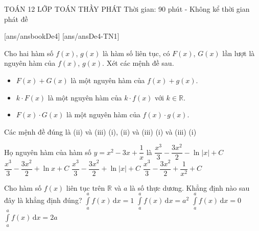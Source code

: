 \begin{name}
	{\tenchude}
	{TOÁN 12}
	{LỚP TOÁN THẦY PHÁT}
	{Thời gian: 90 phút - Không kể thời gian phát đề}
\end{name}
[ans/ansbookDe4]
\TN
{}[ans/ansDe4-TN1]
\begin{ex}%
Cho hai hàm số $f(x)$, $g(x)$ là hàm số liên tục, có $F(x)$, $G(x)$ lần lượt là nguyên hàm của $f(x)$, $g(x)$. Xét các mệnh đề sau.
\begin{itemize}
\item[(i)] $F(x)+G(x)$ là một nguyên hàm của $f(x)+g(x)$.
\item[(ii)] $k\cdot F(x)$ là một nguyên hàm của $k\cdot f(x)$ với $k\in\mathbb{R}$.
\item[(iii)] $F(x)\cdot G(x)$ là một nguyên hàm của $f(x)\cdot g(x)$.
\end{itemize}
Các mệnh đề đúng là
\choice
{(ii) và (iii)}
{(i), (ii) và (iii)}
{(i) và (iii)}
{\True (i)}
\end{ex}

\begin{ex}%
Họ nguyên hàm của hàm số $y=x^2-3x+\dfrac{1}{x}$ là
\choice
{$\dfrac{x^3}{3}-\dfrac{3x^2}{2}-\ln\left|x\right|+C$}
{$\dfrac{x^3}{3}-\dfrac{3x^2}{2}+\ln x+C$}
{\True $\dfrac{x^3}{3}-\dfrac{3x^2}{2}+\ln\left|x\right|+C$}
{$\dfrac{x^3}{3}-\dfrac{3x^2}{2}+\dfrac{1}{x^2}+C$}
\end{ex}

\begin{ex}%
Cho hàm số $f(x)$ liên tục trên $\mathbb{R}$ và $a$ là số thực dương. Khẳng định nào sau đây là khẳng định đúng?
\choice
{$\displaystyle\int\limits_a^a f(x) \mathrm{\,d}x=1$}
{$\displaystyle\int\limits_a^af(x) \mathrm{\,d}x=a^2$}
{\True $\displaystyle\int\limits_a^af(x) \mathrm{\,d}x=0$}
{$\displaystyle\int\limits_a^a f(x) \mathrm{\,d}x=2a$}
\end{ex}

